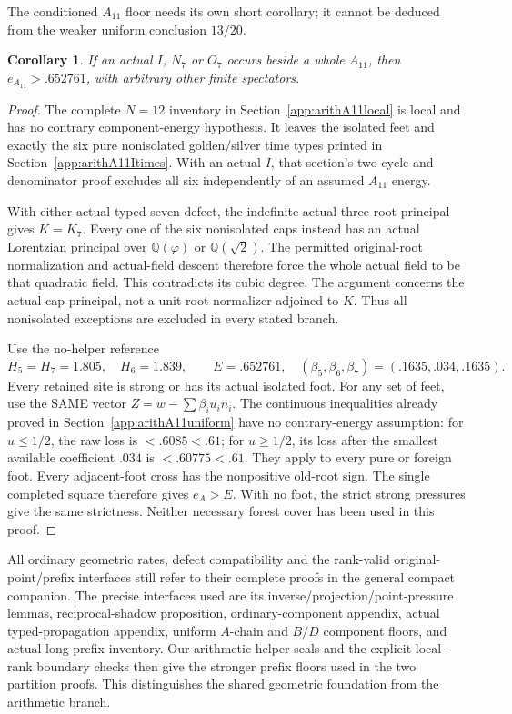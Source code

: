 \documentclass[11pt]{article}
\newtheorem{corollary}[theorem]{Corollary}
\begin{document}
The conditioned \(A_{11}\) floor
needs its own short corollary;
it cannot be deduced from the weaker
uniform conclusion \(13/20\).

\begin{corollary}\label{cor:arithA11conditionedcover}
If an actual \(I\), \(N_7\) or \(O_7\)
occurs beside a whole \(A_{11}\),
then \(e_{A_{11}}>.652761\),
with arbitrary other finite spectators.
\end{corollary}
\begin{proof}
The complete \(N=12\) inventory in
Section~\ref{app:arithA11local}
is local and has no contrary
component-energy hypothesis.
It leaves the isolated feet and
exactly the six pure nonisolated
golden/silver time types printed
in Section~\ref{app:arithA11Itimes}.
With an actual \(I\), that section's
two-cycle and denominator proof
excludes all six independently
of an assumed \(A_{11}\) energy.

With either actual typed-seven
defect, the indefinite actual
three-root principal gives \(K=K_7\).
Every one of the six nonisolated
caps instead has an actual
Lorentzian principal over
\(\mathbb Q(\varphi)\) or
\(\mathbb Q(\sqrt2)\).
The permitted original-root
normalization and actual-field
descent therefore force the whole
actual field to be that quadratic
field.
This contradicts its cubic degree.
The argument concerns the actual
cap principal, not a unit-root
normalizer adjoined to \(K\).
Thus all nonisolated exceptions
are excluded in every stated branch.

Use the no-helper reference
\[
 H_5=H_7=1.805,\quad H_6=1.839,\qquad
 E=.652761,\quad
       (\beta_5,\beta_6,\beta_7)=(.1635,.034,.1635).
\]
Every retained site is strong or
has its actual isolated foot.
For any set of feet, use the
SAME vector
\(Z=w-\sum\beta_i u_i n_i\).
The continuous inequalities already
proved in Section~\ref{app:arithA11uniform}
have no contrary-energy assumption:
for \(u\le1/2\), the raw loss is
\(<.6085<.61\);
for \(u\ge1/2\), its loss after
the smallest available coefficient
\(.034\) is \(<.60775<.61\).
They apply to every pure or
foreign foot.
Every adjacent-foot cross has
the nonpositive old-root sign.
The single completed square
therefore gives \(e_A>E\).
With no foot, the strict strong
pressures give the same strictness.
Neither necessary forest cover
has been used in this proof.
\end{proof}

All ordinary geometric rates,
defect compatibility and the
rank-valid original-point/prefix
interfaces still refer to their
complete proofs in the general
compact companion.
The precise interfaces used are
its inverse/projection/point-pressure
lemmas, reciprocal-shadow proposition,
ordinary-component appendix,
actual typed-propagation appendix,
uniform \(A\)-chain and \(B/D\)
component floors, and actual
long-prefix inventory.
Our arithmetic helper seals and
the explicit local-rank boundary
checks then give the stronger
prefix floors used in the two
partition proofs.
This distinguishes the shared
geometric foundation from the
arithmetic branch.
\end{document}
